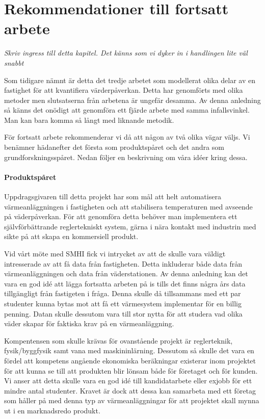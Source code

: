 \section{Rekommendationer till fortsatt arbete}

\emph{\color{red} Skriv ingress till detta kapitel. Det känns som vi dyker in i handlingen lite väl snabbt}

Som tidigare nämnt är detta det tredje arbetet som modellerat olika delar av en fastighet för att
kvantifiera värderpåverkan. Detta har genomförts med olika metoder men slutsatserna från arbetena är ungefär desamma.
Av denna anledning så känns det onödigt att genomföra ett fjärde arbete med samma infallsvinkel. Man kan bara komma så
långt med liknande metodik.

För fortsatt arbete rekommenderar vi då att någon av två olika vägar väljs. Vi benämner hädanefter det första
som produktspåret och det andra som grundforskningsspåret. Nedan följer en beskrivning om våra idéer kring dessa.

\paragraph{Produktspåret}
Uppdragsgivaren till detta projekt har som mål att helt automatisera värmeanläggningen i fastigheten och att stabilisera
temperaturen med avseende på väderpåverkan. För att genomföra detta behöver man implementera ett självförbättrande
reglertekniskt system, gärna i nära kontakt med industrin med sikte på att skapa en kommersiell produkt. 

Vid vårt möte med SMHI fick vi intrycket av att de skulle vara väldigt intresserade av att få data från fastigheten.
Detta inkluderar både data från värmeanläggningen och data från väderstationen. Av denna anledning kan det vara
en god idé att lägga fortsatta arbeten på is tills det finns några års data tillgängligt från fastigeten i fråga.
Denna skulle då tillsammans med ett par studenter kunna bytas mot att få ett värmesystem implementar för en billig
penning. Datan skulle dessutom vara till stor nytta för att studera vad olika väder skapar för faktiska
krav på en värmeanläggning. 

Kompentensen som skulle krävas för ovanstående projekt är reglerteknik, fysik/byggfysik samt vana med maskininlärning.
Dessutom så skulle det vara en fördel att kompetens angående ekonomiska beräkningar existerar inom projektet för att
kunna se till att produkten blir lönsam både för företaget och för kunden. Vi anser att detta skulle vara en god
idé till kandidatarbete eller exjobb för ett mindre antal studenter. Kravet är dock att dessa kan samarbeta med
ett företag som håller på med denna typ av värmeanläggningar för att projektet skall mynna ut i en marknadsredo produkt.


